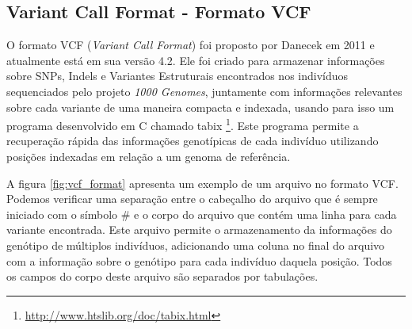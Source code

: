\subsection{Variant Call Format - Formato VCF}

O formato VCF (\textit{Variant Call Format}) foi proposto por Danecek em 2011 \cite{Danecek2011} e atualmente está em sua versão 4.2. Ele foi criado para armazenar informações sobre SNPs, Indels e Variantes Estruturais encontrados nos indivíduos sequenciados pelo projeto \textit{1000 Genomes}, juntamente com informações relevantes sobre cada variante de uma maneira compacta e indexada, usando para isso um programa desenvolvido em C chamado tabix \footnote{\url{http://www.htslib.org/doc/tabix.html}}. Este programa permite a recuperação rápida das informações genotípicas de cada indivíduo utilizando posições indexadas em relação a um genoma de referência.

A figura \ref{fig:vcf_format} apresenta um exemplo de um arquivo no formato VCF. Podemos verificar uma separação entre o cabeçalho do arquivo que é sempre iniciado com o símbolo \# e o corpo do arquivo que contém uma linha para cada variante encontrada. Este arquivo permite o armazenamento da informações do genótipo de múltiplos indivíduos, adicionando uma coluna no final do arquivo com a informação sobre o genótipo para cada indivíduo daquela posição. Todos os campos do corpo deste arquivo são separados por tabulações.



